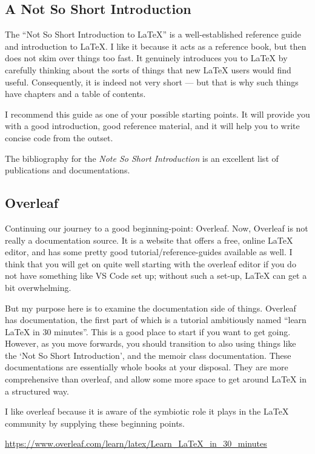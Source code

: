 \documentclass[11pt, oneside]{memoir}
\begin{document}
\subsection{A Not So Short Introduction}

The ``Not So Short Introduction to LaTeX'' is a well-established reference guide and introduction to LaTeX. I like it because it acts as a reference book, but then does not skim over things too fast. It genuinely introduces you to LaTeX by carefully thinking about the sorts of things that new LaTeX users would find useful. Consequently, it is indeed not very short — but that is why such things have chapters and a table of contents.

I recommend this guide as one of your possible starting points. It will provide you with a good introduction, good reference material, and it will help you to write concise code from the outset.

The bibliography for the \emph{Note So Short Introduction} is an excellent list of publications and documentations.

\subsection{Overleaf}

Continuing our journey to a good beginning-point: Overleaf. Now, Overleaf is not really a documentation source. It is a website that offers a free, online LaTeX editor, and has some pretty good tutorial/reference-guides available as well. I think that you will get on quite well starting with the overleaf editor if you do not have something like VS Code set up; without such a set-up, LaTeX can get a bit overwhelming.

But my purpose here is to examine the documentation side of things. Overleaf has documentation, the first part of which is a tutorial ambitiously named ``learn LaTeX in 30 minutes''. This is a good place to start if you want to get going. However, as you move forwards, you should transition to also using things like the `Not So Short Introduction', and the memoir class documentation. These documentations are essentially whole books at your disposal. They are more comprehensive than overleaf, and allow some more space to get around LaTeX in a structured way.

I like overleaf because it is aware of the symbiotic role it plays in the LaTeX community by supplying these beginning points.

\url{https://www.overleaf.com/learn/latex/Learn_LaTeX_in_30_minutes}
\end{document}
